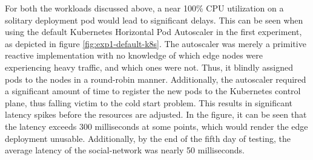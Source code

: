 For both the workloads discussed above, a near 100\% CPU utilization on a solitary deployment pod would lead to significant delays. This can be seen when using the default Kubernetes Horizontal Pod Autoscaler in the first experiment, as depicted in figure \ref{fig:exp1-default-k8s}. The autoscaler was merely a primitive reactive implementation with no knowledge of which edge nodes were experiencing heavy traffic, and which ones were not. Thus, it blindly assigned pods to the nodes in a round-robin manner. Additionally, the autoscaler required a significant amount of time to register the new pods to the Kubernetes control plane, thus falling victim to the cold start problem. This results in significant latency spikes before the resources are adjusted. In the figure, it can be seen that the latency exceeds 300 milliseconds at some points, which would render the edge deployment unusable. Additionally, by the end of the fifth day of testing, the average latency of the social-network was nearly 50 milliseconds.\par

